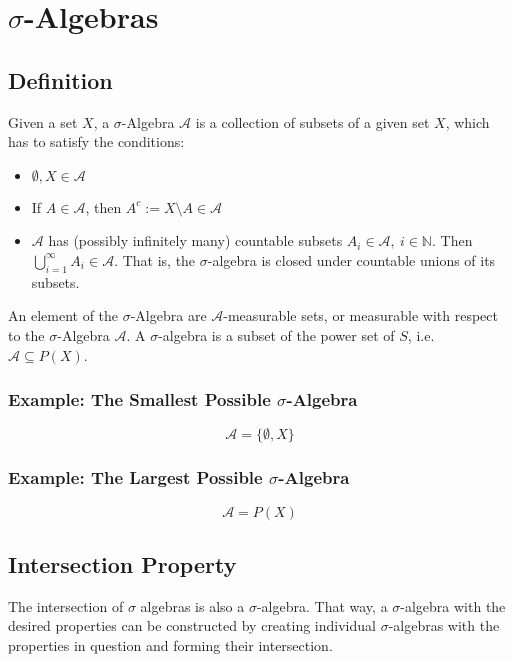\section{$\sigma$-Algebras}

\subsection{Definition}
Given a set $X$, a $\sigma$-Algebra $\mathscr{A}$ is a collection of subsets of a given set $X$, which has to satisfy the conditions:


\begin{itemize}
\item $\emptyset, X \in \mathscr{A}$
\item If $A\in\mathscr{A}$, then $A^c := X\setminus A \in \mathscr{A}$
\item $\mathscr{A}$ has (possibly infinitely many) countable subsets $A_i \in \mathscr{A},\ i \in \mathbb{N}$. Then $\bigcup_{i=1}^{\infty}A_i \in \mathscr{A}$. That is, the $\sigma$-algebra is closed under countable unions of its subsets. 
\end{itemize}

An element of the $\sigma$-Algebra are $\mathscr{A}$-measurable sets, or measurable with respect to the $\sigma$-Algebra $\mathscr{A}$. A $\sigma$-algebra is a subset of the power set of $S$, i.e. $\mathscr{A} \subseteq P(X)$. 

\subsubsection{Example: The Smallest Possible $\sigma$-Algebra}

\begin{equation}
\mathscr{A} = \{\emptyset, X\}
\end{equation}

\subsubsection{Example: The Largest Possible $\sigma$-Algebra} 

\begin{equation}
\mathscr{A} = P(X)
\end{equation}


\subsection{Intersection Property}
The intersection of $\sigma$ algebras is also a $\sigma$-algebra. That way, a $\sigma$-algebra with the desired properties can be constructed by creating individual $\sigma$-algebras with the properties in question and forming their intersection.

